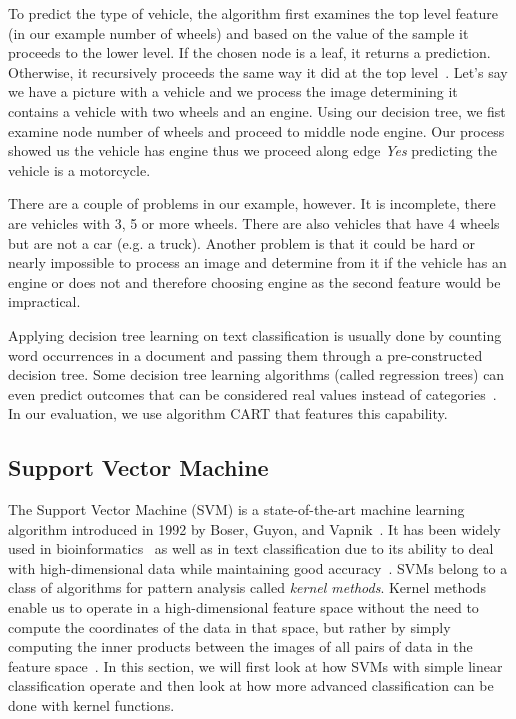 To predict the type of vehicle, the algorithm first examines the top level feature (in our example number of wheels) and based on the value of the sample it proceeds to the lower level. If the chosen node is a leaf, it returns a prediction. Otherwise, it recursively proceeds the same way it did at the top level~\cite{mitchell1997machine}. Let's say we have a picture with a vehicle and we process the image determining it contains a vehicle with two wheels and an engine. Using our decision tree, we fist examine node number of wheels and proceed to middle node engine. Our process showed us the vehicle has engine thus we proceed along edge \textit{Yes} predicting the vehicle is a motorcycle.

There are a couple of problems in our example, however. It is incomplete, there are vehicles with 3, 5 or more wheels. There are also vehicles that have 4 wheels but are not a car (e.g. a truck). Another problem is that it could be hard or nearly impossible to process an image and determine from it if the vehicle has an engine or does not and therefore choosing engine as the second feature would be impractical.

Applying decision tree learning on text classification is usually done by counting word occurrences in a document and passing them through a pre-constructed decision tree. Some decision tree learning algorithms (called regression trees) can even predict outcomes that can be considered real values instead of categories~\cite{loh2011cart}. In our evaluation, we use algorithm CART that features this capability.

\subsection{Support Vector Machine}

The Support Vector Machine (SVM) is a state-of-the-art machine learning algorithm introduced in 1992 by Boser, Guyon, and Vapnik~\cite{boser1992training}. It has been widely used in bioinformatics~\cite{byvatov2002support} as well as in text classification due to its ability to deal with high-dimensional data while maintaining good accuracy~\cite{joachims1998text}. SVMs belong to a class of algorithms for pattern analysis called \textit{kernel methods}. Kernel methods enable us to operate in a high-dimensional feature space without the need to compute the coordinates of the data in that space, but rather by simply computing the inner products between the images of all pairs of data in the feature space~\cite{Ben-hur}\cite{manning2008introduction}. In this section, we will first look at how SVMs with simple linear classification operate and then look at how more advanced classification can be done with kernel functions.

